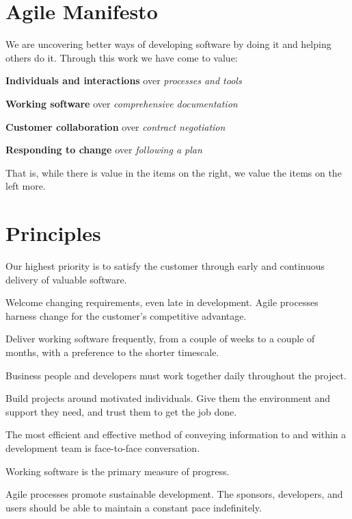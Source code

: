 \documentclass[11pt]{article}
\begin{document}
\newpage
\newcommand{\myspace}{\vspace{1em}}
\centering
\section*{Agile Manifesto}
\begin{adjustwidth}{1.2cm}{1.2cm}
\centering
We are uncovering better ways of developing software by doing it and helping others do it. Through this work we have come to value:
\myspace

\textbf{Individuals and interactions} over \textit{processes and tools}
\myspace

\textbf{Working software} over \textit{comprehensive documentation}
\myspace

\textbf{Customer collaboration} over \textit{contract negotiation}
\myspace

\textbf{Responding to change} over \textit{following a plan}
\myspace

That is, while there is value in the items on the right, we value the items on the left more.
\end{adjustwidth}
\centering
\section*{Principles}
     Our highest priority is to satisfy the customer through early and continuous delivery of valuable software.

    \myspace
     Welcome changing requirements, even late in development. Agile processes harness change for the customer's competitive advantage.

    \myspace
     Deliver working software frequently, from a couple of weeks to a couple of months, with a preference to the shorter timescale.

    \myspace
     Business people and developers must work together daily throughout the project.

    \myspace
     Build projects around motivated individuals. Give them the environment and support they need, and trust them to get the job done.

    \myspace
     The most efficient and effective method of conveying information to and within a development team is face-to-face conversation.

    \myspace
     Working software is the primary measure of progress.

    \myspace
     Agile processes promote sustainable development. The sponsors, developers, and users should be able to maintain a constant pace indefinitely.
\end{document}
